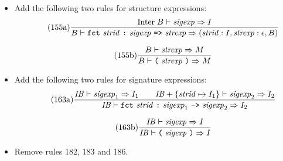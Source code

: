 \documentclass[twoside,titlepage]{article}
\begin{document}
\begin{appendix}
\begin{itemize}
\item Add the following two rules for structure expressions:
  \begin{equation}
  \tag{155a}
  \frac{
  \mbox{Inter}\;B \vdash \mathit{sigexp} \Rightarrow I
  }{
  B \vdash {\tt{fct}}~\mathit{strid}~\mbox{\tt:}~\mathit{sigexp}~\mbox{\tt=>}~\mathit{strexp} \Rightarrow (\mathit{strid}:I, \mathit{strexp}:\epsilon, B)
  }
  \end{equation}

  \begin{equation}
  \tag{155b}
  \frac{
  B \vdash \mathit{strexp} \Rightarrow M
  }{
  B \vdash \mbox{\tt(}~\mathit{strexp}~\mbox{\tt)} \Rightarrow M
  }
  \end{equation}

\item Add the following two rules for signature expressions:
  \begin{equation}
  \tag{163a}
  \frac{
  \mathit{IB} \vdash \mathit{sigexp}_1 \Rightarrow I_1
  \qquad
  \mathit{IB} + \{\mathit{strid}\mapsto I_1\} \vdash \mathit{sigexp}_2 \Rightarrow I_2
  }{
  \mathit{IB} \vdash {\tt{fct}}~\mathit{strid}~\mbox{\tt:}~\mathit{sigexp}_1~\mbox{\tt->}~\mathit{sigexp}_2 \Rightarrow I_2
  }
  \end{equation}

  \begin{equation}
  \tag{163b}
  \frac{
  \mathit{IB} \vdash \mathit{sigexp} \Rightarrow I
  }{
  \mathit{IB} \vdash \mbox{\tt(}~\mathit{sigexp}~\mbox{\tt)} \Rightarrow I
  }
  \end{equation}

\item Remove rules 182, 183 and 186.
\end{itemize}


\end{appendix}
\end{document}
